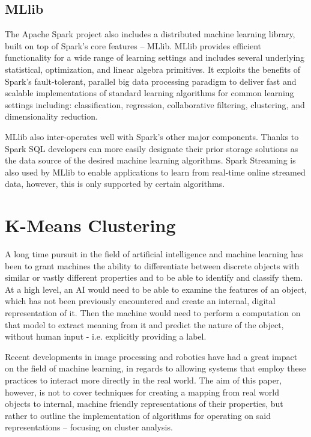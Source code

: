 \documentclass{l4proj}
\begin{document}
\section{MLlib}

The Apache Spark project also includes a distributed machine learning library, built on top of Spark's core features -- MLlib. MLlib provides efficient functionality for a wide range of learning settings and includes several underlying statistical, optimization,
and linear algebra primitives. It exploits the benefits of Spark's fault-tolerant, parallel big data processing paradigm to deliver fast and scalable implementations of standard learning algorithms for common learning settings including:  classification, regression, collaborative filtering, clustering, and dimensionality reduction\cite{MLlib}.

MLlib also inter-operates well with Spark's other major components. Thanks to Spark SQL\cite{SQL} developers can more easily designate their prior storage solutions as the data source of the desired machine learning algorithms. Spark Streaming is also used by MLlib to enable applications to learn from real-time online streamed data, however, this is only supported by certain algorithms.


\chapter{K-Means Clustering}
\label{kmeans}

A long time pursuit in the field of artificial intelligence and machine learning has been to grant machines the ability to differentiate between discrete objects with similar or vastly different properties and to be able to identify and classify them. At a high level, an AI would need to be able to examine the features of an object, which has not been previously encountered and create an internal, digital representation of it. Then the machine would need to perform a computation on that model to extract meaning from it and predict the nature of the object, without human input - i.e. explicitly providing a label.

Recent developments in image processing and robotics have had a great impact on the field of machine learning, in regards to allowing systems that employ these practices to interact more directly in the real world. The aim of this paper, however, is not to cover techniques for creating a mapping from real world objects to internal, machine friendly representations of their properties, but rather to outline the implementation of algorithms for operating on said representations -- focusing on cluster analysis.
\end{document}
